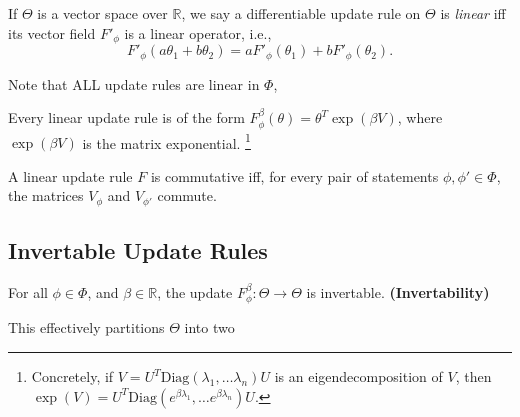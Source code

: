 \documentclass{article}
\begin{document}
\begin{defn}\label{ax:linear}
    If $\Theta$ is a vector space over $\mathbb R$, we say
    a differentiable update rule on $\Theta$ is \emph{linear} iff its vector field $F'_\phi$ is a linear operator, i.e.,
    \[ F'_\phi(a \theta_1 + b \theta_2) = a F'_\phi(\theta_1) + b F'_\phi(\theta_2). \]
\end{defn}


Note that ALL update rules are linear in $\Phi$,
\begin{prop}

\end{prop}


\begin{prop}
    Every linear update rule is of the form
    $
        F^{\beta}_\phi(\theta) =  \theta^{T} \exp(\beta V)
    $,
    where $\exp(\beta V)$ is the matrix exponential.%
        \footnote{Concretely, if $V = U^T \mathrm{Diag}(\lambda_1, \ldots \lambda_n) U$ is an eigendecomposition of $V$, then $\exp(V) = U^T \mathrm{Diag}(e^{\beta\lambda_1}, \ldots e^{\beta\lambda_n}) U$.}
\end{prop}

\begin{prop}
    A linear update rule $F$ is commutative iff, for every pair of statements  $\phi, \phi' \in \Phi$, the
    matrices $V_\phi$ and $V_{\phi'}$ commute.
\end{prop}



\subsection{Invertable Update Rules}
\begin{URaxioms}
    \item For all $\phi\in\Phi$, and $\beta \in \mathbb R$, the update
    $F^{\beta}_{\phi}: \Theta \to \Theta$ is invertable.
    \hfill\textbf{(Invertability)} \label{ax:invert}
\end{URaxioms}


This effectively partitions $\Theta$ into two
\end{document}
